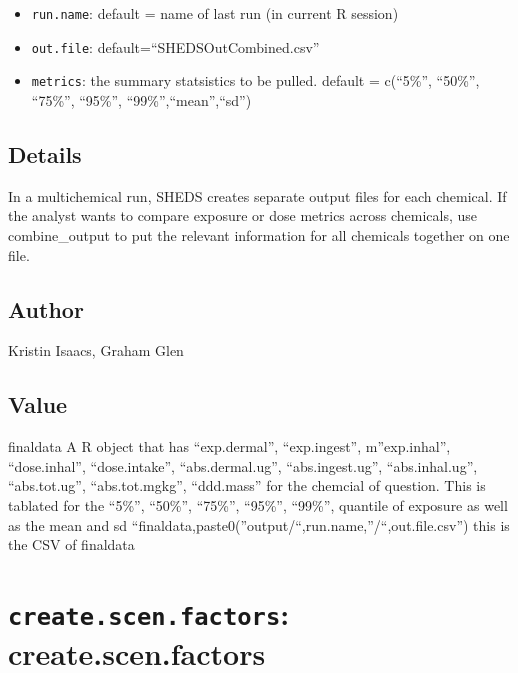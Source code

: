 \documentclass[
]{article}
\providecommand{\tightlist}{%
  \setlength{\itemsep}{0pt}\setlength{\parskip}{0pt}}
\begin{document}
\begin{itemize}
\tightlist
\item
  \texttt{run.name}: default = name of last run (in current R session)
\item
  \texttt{out.file}: default=``SHEDSOutCombined.csv''
\item
  \texttt{metrics}: the summary statsistics to be pulled. default =
  c(``5\%'', ``50\%'', ``75\%'', ``95\%'', ``99\%'',``mean'',``sd'')
\end{itemize}

\hypertarget{details-5}{%
\subsection{Details}\label{details-5}}

In a multichemical run, SHEDS creates separate output files for each
chemical. If the analyst wants to compare exposure or dose metrics
across chemicals, use combine\_output to put the relevant information
for all chemicals together on one file.

\hypertarget{author-6}{%
\subsection{Author}\label{author-6}}

Kristin Isaacs, Graham Glen

\hypertarget{value-6}{%
\subsection{Value}\label{value-6}}

finaldata A R object that has ``exp.dermal'', ``exp.ingest'',
m''exp.inhal'', ``dose.inhal'', ``dose.intake'', ``abs.dermal.ug'',
``abs.ingest.ug'', ``abs.inhal.ug'', ``abs.tot.ug'', ``abs.tot.mgkg'',
``ddd.mass'' for the chemcial of question. This is tablated for the
``5\%'', ``50\%'', ``75\%'', ``95\%'', ``99\%'', quantile of exposure as
well as the mean and sd
``finaldata,paste0(''output/``,run.name,''/``,out.file.csv'') this is
the CSV of finaldata

\hypertarget{create.scen.factors-create.scen.factors}{%
\section{\texorpdfstring{\texttt{create.scen.factors}:
create.scen.factors}{create.scen.factors: create.scen.factors}}\label{create.scen.factors-create.scen.factors}}
\end{document}
